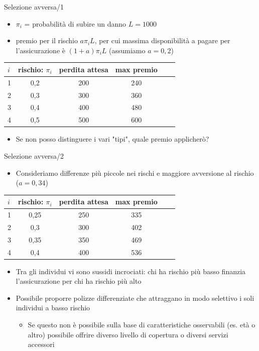 \documentclass[aspectratio=149,11pt]{beamer}
\begin{document}
\begin{frame}{Selezione avversa/1}
\begin{itemize}
\item \(\pi_i\) = probabilità di subire un danno \(L=1000\)
\item premio per il rischio \(a\pi_iL\), per cui massima disponibilità a pagare per
l'assicurazione è \((1+a)\pi_iL\) (assumiamo \(a=0,2\))
\end{itemize}

\begin{center}
\begin{tabular}{lccccl}
  \toprule
  $i$&rischio: $\pi_i$&perdita attesa& max premio\\
  \midrule
  1 & 0,2 &200 & 240 \\
  2 & 0,3 &300 & 360 \\
  3 & 0,4 &400 & 480 \\
  4 & 0,5 &500 & 600 \\
  \bottomrule
\end{tabular}  
\end{center}

\begin{itemize}
\item Se non posso distinguere i vari "tipi", quale premio applicherò?
\end{itemize}
\end{frame}

\begin{frame}{Selezione avversa/2}
\begin{itemize}
\item Consideriamo differenze più piccole nei rischi e maggiore avversione al rischio (\(a=0,34\))
\end{itemize}

\begin{center}
\begin{tabular}{lccccl}
  \toprule
  $i$&rischio: $\pi_i$&perdita attesa& max premio\\
  \midrule
  1 & 0,25 &250 & 335 \\
  2 & 0,3 &300 & 402 \\
  3 & 0,35 &350 & 469 \\
  4 & 0,4 &400 & 536 \\
  \bottomrule
\end{tabular}
\end{center}

\begin{itemize}
\item Tra gli individui vi sono \alert{sussidi incrociati}: chi ha rischio più basso finanzia l'assicurazione per chi ha rischio più alto

\item Possibile proporre polizze differenziate che attraggano in modo selettivo i
soli individui a basso rischio
\begin{itemize}
\item Se questo non è possibile sulla base di caratteristiche osservabili (es. età
o altro) possibile offrire diverso livello di copertura o diversi servizi
accessori
\end{itemize}
\end{itemize}
\end{frame}
\end{document}
